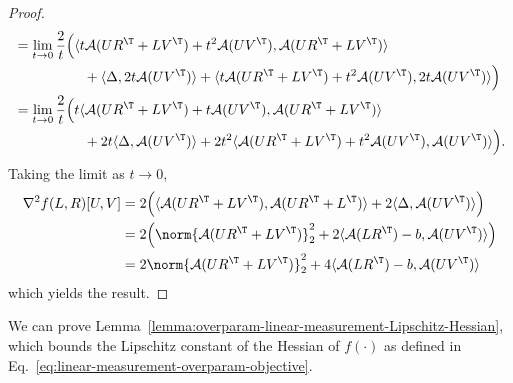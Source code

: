 \begin{proof}
\begin{align*}
        &= \lim_{t\rightarrow 0}\frac{2}{t}\Big(\langle t \mathcal{A}(UR^\T + LV^\T) + t^2 \mathcal{A}(UV^\T), \mathcal{A}(UR^\T + LV^\T)\rangle \\
        &\qquad \qquad \quad +\langle \Delta, 2t\mathcal{A}(UV^\T)\rangle + \langle t \mathcal{A}(UR^\T + LV^\T) + t^2 \mathcal{A}(UV^\T),2t\mathcal{A}(UV^\T)\rangle\Big)\\
        &= \lim_{t\rightarrow 0}\frac{2}{t}\Big(t\langle  \mathcal{A}(UR^\T + LV^\T) + t \mathcal{A}(UV^\T), \mathcal{A}(UR^\T + LV^\T)\rangle \\
        &\qquad \qquad \quad +2t \langle \Delta, \mathcal{A}(UV^\T)\rangle + 2t^2\langle \mathcal{A}(UR^\T + LV^\T) + t^2 \mathcal{A}(UV^\T),\mathcal{A}(UV^\T)\rangle\Big).
    \end{align*}
    Taking the limit as $t\rightarrow 0$,
    \begin{align*}
        \nabla^2 f(L,R)[U,V] &= 2\Big(\langle \mathcal{A}(UR^\T + LV^\T), \mathcal{A}(UR^\T + L^\T)\rangle + 2\langle \Delta, \mathcal{A}(UV^\T)\rangle\Big)\\
        &= 2\Big(\norm{\mathcal{A}(UR^\T + LV^\T)}^2_2 + 2\langle \mathcal{A}(LR^\T)-b, \mathcal{A}(UV^\T)\rangle\Big)\\
        &= 2\norm{\mathcal{A}(UR^\T + LV^\T)}^2_2 + 4\langle \mathcal{A}(LR^\T)-b, \mathcal{A}(UV^\T)\rangle
    \end{align*}
    which yields the result.
\end{proof}

We can prove Lemma~\ref{lemma:overparam-linear-measurement-Lipschitz-Hessian}, which bounds the Lipschitz constant of the Hessian of $f(\cdot)$ as defined in Eq.~\ref{eq:linear-measurement-overparam-objective}.

